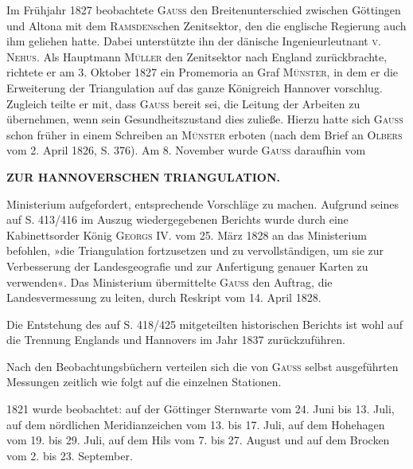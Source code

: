 \par\noindent\hspace*{\parindent}Im Frühjahr 1827 beobachtete \textsc{Gauss} den Breitenunterschied zwischen Göttingen und Altona mit dem \textsc{Ramsden}schen Zenitsektor, den die englische Regierung auch ihm geliehen hatte. Dabei unterstützte ihn der dänische Ingenieurleutnant \textsc{v. Nehus}. Als Hauptmann \textsc{Müller} den Zenitsektor nach England zurückbrachte, richtete er am 3. Oktober 1827 ein Promemoria an Graf \textsc{Münster}, in dem er die Erweiterung der Triangulation auf das ganze Königreich Hannover vorschlug. Zugleich teilte er mit, dass \textsc{Gauss} bereit sei, die Leitung der Arbeiten zu übernehmen, wenn sein Gesundheitszustand dies zuließe. Hierzu hatte sich \textsc{Gauss} schon früher in einem Schreiben an \textsc{Münster} erboten (nach dem Brief an \textsc{Olbers} vom 2. April 1826, S. 376). Am 8. November wurde \textsc{Gauss} daraufhin vom

\par\clearpage
\noindent\null\hfill\textbf{ZUR HANNOVERSCHEN TRIANGULATION.}\hfill{}\par\medskip
\noindent Ministerium aufgefordert, entsprechende Vorschläge zu machen. Aufgrund seines auf S. 413/416 im Auszug wiedergegebenen Berichts wurde durch eine Kabinettsorder König \textsc{Georgs} IV. vom 25. März 1828 an das Ministerium befohlen, »die Triangulation fortzusetzen und zu vervollständigen, um sie zur Verbesserung der Landesgeografie und zur Anfertigung genauer Karten zu verwenden«. Das Ministerium übermittelte \textsc{Gauss} den Auftrag, die Landesvermessung zu leiten, durch Reskript vom 14. April 1828.

\par\noindent\hspace*{\parindent}Die Entstehung des auf S. 418/425 mitgeteilten historischen Berichts ist wohl auf die Trennung Englands und Hannovers im Jahr 1837 zurückzuführen.
\par\bigskip
\par\noindent\hspace*{\parindent}Nach den Beobachtungsbüchern verteilen sich die von \textsc{Gauss} selbst ausgeführten Messungen zeitlich wie folgt auf die einzelnen Stationen.

\par\noindent\hspace*{\parindent}1821 wurde beobachtet: auf der Göttinger Sternwarte vom 24. Juni bis 13. Juli, auf dem nördlichen Meridianzeichen vom 13. bis 17. Juli, auf dem Hohehagen vom 19. bis 29. Juli, auf dem Hils vom 7. bis 27. August und auf dem Brocken vom 2. bis 23. September.

